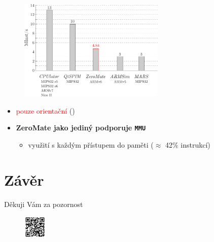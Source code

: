 \documentclass[compress]{beamer}
\begin{document}
\begin{frame}
	\vspace{-0.2cm}
	\begin{figure}
		\centering
		\includegraphics[width=0.62\textwidth]{img/performance_comparison.pdf}
	\end{figure}
	\vspace{-0.4cm}
	\noindent\makebox[\linewidth]{\rule{\textwidth}{0.4pt}}
	\vspace{-0.4cm}
	\begin{itemize}
		\item \textcolor{red}{pouze orientační} (\href{https://cpulator.01xz.net/}{})
		\item \textbf{ZeroMate jako jediný podporuje \texttt{MMU}}
		\begin{itemize}
			\item využití s každým přístupem do paměti ($\approx$ 42\% instrukcí)
		\end{itemize}
	\end{itemize}
\end{frame}

\section{Závěr}

\begin{frame}
  \centering \Large
  Děkuji Vám za pozornost\\
  \href{https://github.com/silhavyj/ZeroMate}{}
  \begin{figure}
  	\centering
  	\includegraphics[width=0.10\textwidth]{img/qr-code.pdf}
  \end{figure}
\end{frame}
\end{document}
